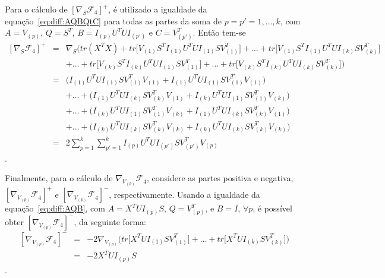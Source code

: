 \documentclass[
    12pt,                %
    oneside,            %
    a4paper,            %
    english,            %
    brazil                %
    ]{abntex2ppgsi}
\begin{document}
Para o cálculo de $[\nabla_S \mathcal{F}_4]^+$, é utilizado a igualdade da equação~\ref{eq:diff:AQBQtC} para todas as partes da soma de $p = p' = 1, \dots, k$, com $A = V_{(p)}$, $Q = S^T$, $B = I_{(p)} U^T U I_{(p')}$ e $C = V_{(p')}^T$. Então tem-se
\[
    \begin{array}{lcl}
        [\nabla_S \mathcal{F}_4]^+ & = & \nabla_S \Big( tr(X^TX) + tr\big[ V_{(1)} S^T I_{(1)} U^T U I_{(1)} S V_{(1)}^T \big] + \dots + tr\big[ V_{(1)} S^T I_{(1)} U^T U I_{(k)} S V_{(k)}^T \big]  \\
                                   &   & + \dots + tr\big[ V_{(k)} S^T I_{(k)} U^T U I_{(1)} S V_{(1)}^T \big] + \dots + tr\big[ V_{(k)} S^T I_{(k)} U^T U I_{(k)} S V_{(k)}^T \big] \Big) \\
                                   & = & \big( I_{(1)} U^T U I_{(1)} S V_{(1)}^T V_{(1)} + I_{(1)} U^T U I_{(1)} S V_{(1)}^T V_{(1)} \big) \\
                                   &   & + \dots + \big( I_{(1)} U^T U I_{(k)} S V_{(k)}^T V_{(1)} + I_{(k)} U^T U I_{(1)} S V_{(1)}^T V_{(k)} \big) \\
                                   &   & + \dots + \big( I_{(k)} U^T U I_{(1)} S V_{(1)}^T V_{(k)} + I_{(1)} U^T U I_{(k)} S V_{(k)}^T V_{(1)} \big) \\
                                   &   & + \dots + \big( I_{(k)} U^T U I_{(k)} S V_{(k)}^T V_{(k)} + I_{(k)} U^T U I_{(k)} S V_{(k)}^T V_{(k)} \big) \\
                                   & = & 2 \sum_{p=1}^{k} \sum_{p'=1}^{k} I_{(p)} U^T U I_{(p')} S V_{(p')}^T V_{(p)}
    \end{array}
\].


Finalmente, para o cálculo de $\nabla_{V_{(p)}} \mathcal{F}_4$, considere as partes positiva e negativa, $[\nabla_{V_{(p)}} \mathcal{F}_4]^+$ e $[\nabla_{V_{(p)}} \mathcal{F}_4]^-$, respectivamente. Usando a igualdade da equação~\ref{eq:diff:AQB}, com $A = X^T U I_{(p)} S$, $Q = V^{T}_{(p)}$, e $B = I$, $\forall p$, é possível obter $[\nabla_{V_{(p)}} \mathcal{F}_4]^-$, da seguinte forma:
\[
    \begin{array}{lcl}
        [\nabla_{V_{(p)}} \mathcal{F}_4]^- & = & - 2 \nabla_{V_{(p)}} \Big( tr\big[ X^T U I_{(1)}SV_{(1)}^T \big] + \dots + tr\big[ X^T U I_{(k)}SV_{(k)}^T \big] \Big) \\
                                           & = & - 2 X^T U I_{(p)} S
    \end{array}
\].
\end{document}

